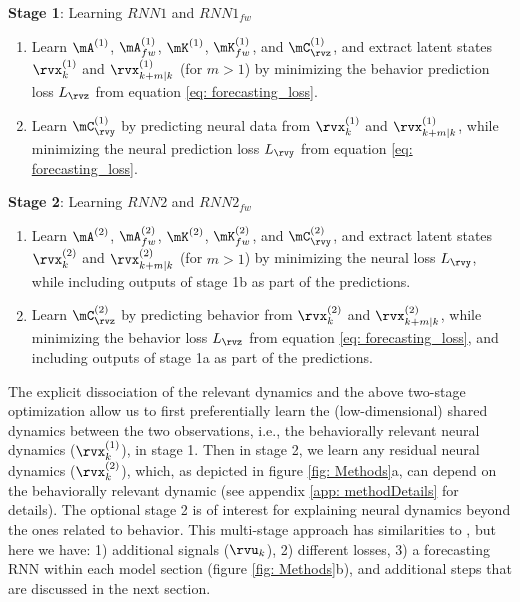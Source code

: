 \documentclass{article} %
\newcommand{\RNN}[1]{\(\textit{RNN#1}\)} %
\newcommand{\RNNfw}[1]{\(\textit{RNN#1}_{fw}\)}
\newcommand{\uk}{\(\rvu_{k}\)}
\begin{document}
\textbf{Stage 1}\label{stage1}: Learning \RNN1 and \RNNfw1
\begin{enumerate}[leftmargin=*,label=\alph*,itemsep=0em]
    \item[1a] \label{stage1a}
    Learn \(\mA^{(1)}\), \(\mA_{fw}^{(1)}\), \(\mK^{(1)}\), \(\mK_{fw}^{(1)}\), and \(\mC_{\rvz}^{(1)}\), and extract latent states \(\rvx_{k}^{(1)}\) and \(\rvx_{k+m|k}^{(1)}\) (for \(m>1\)) by minimizing the behavior prediction loss \(L_{\rvz} \) from equation \ref{eq: forecasting_loss}.
    \item[1b] \label{stage1b}
    Learn \(\mC_{\rvy}^{(1)}\) by predicting neural data from \(\rvx_{k}^{(1)}\) and \(\rvx_{k+m|k}^{(1)}\), while minimizing the neural prediction loss \(L_{\rvy}\) from equation \ref{eq: forecasting_loss}.
\end{enumerate}
\textbf{Stage 2}\label{stage2}: Learning \RNN2 and \RNNfw2
\begin{enumerate}[leftmargin=*,label=\alph*,itemsep=0em]
    \item[2a] \label{stage2a}
    Learn \(\mA^{(2)}\), \(\mA_{fw}^{(2)}\), \(\mK^{(2)}\), \(\mK_{fw}^{(2)}\), and \(\mC_{\rvy}^{(2)}\), and extract latent states \(\rvx_{k}^{(2)}\) and \(\rvx_{k+m|k}^{(2)}\) (for \(m>1\)) by minimizing the neural loss \(L_{\rvy} \), while including outputs of stage 1b as part of the predictions.
    \item[2b] \label{stage2b}
    Learn \(\mC_{\rvz}^{(2)}\) by predicting behavior from \(\rvx_{k}^{(2)}\) and \(\rvx_{k+m|k}^{(2)}\), while minimizing the behavior loss \(L_{\rvz} \) from equation \ref{eq: forecasting_loss}, and including outputs of stage 1a as part of the predictions.
\end{enumerate}
The explicit dissociation of the relevant dynamics and the above two-stage optimization allow us to first preferentially learn the (low-dimensional) shared dynamics between the two observations, i.e., the behaviorally relevant neural dynamics (\(\rvx_{k}^{(1)}\)), in stage 1. Then in stage 2, we learn any residual neural dynamics (\(\rvx_{k}^{(2)}\)), which, as depicted in figure \ref{fig: Methods}a, can depend on the behaviorally relevant dynamic (see appendix \ref{app: methodDetails} for details). The optional stage 2 is of interest for explaining neural dynamics beyond the ones related to behavior. This multi-stage approach has similarities to \citet{sani2024dissociative}, but here we have: 1) additional signals (\uk), 2) different losses, 3) a forecasting RNN within each model section (figure \ref{fig: Methods}b), and additional steps that are discussed in the next section. 
\end{document}
